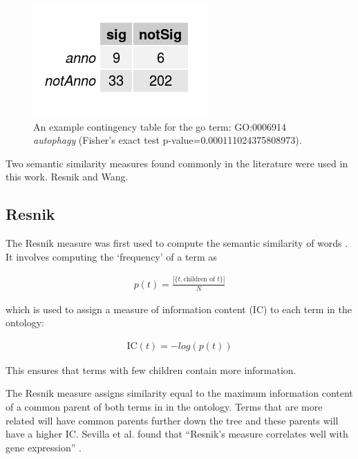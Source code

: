 \documentclass{report}
\begin{document}
	
	\begin{figure}
		\centering
		\includegraphics[width=\textwidth]{../contingency_table.png}
		\caption{An example contingency table for the go term: GO:0006914 \textit{autophagy} (Fisher's exact test p-value=0.000111024375808973).}
		\label{cont_table}
	\end{figure}
	
	Two semantic similarity measures found commonly in the literature were used in this work. Resnik and Wang.
	
	
	\subsection{Resnik}
	
	The Resnik measure was first used to compute the semantic similarity of words \cite{resnik1999semantic}. It involves computing the `frequency' of a term as 
	
	\begin{align}
	p(t) = \frac{|\{t, \text{children of } t\}|}{N}
	\end{align}
	
	which is used to assign a measure of information content (IC) to each term in the ontology:
	
		
	\begin{align}
	\text{IC}(t) = -log(p(t))
	\end{align}
	
	This ensures that terms with few children contain more information.

	The Resnik measure assigns similarity equal to the maximum information content of a common parent of both terms in in the ontology. Terms that are more related will have common parents further down the tree and these parents will have a higher IC. Sevilla et al. found that ``Resnik's measure correlates well with gene expression'' \cite{sevilla2005correlation}.
	
\end{document}
